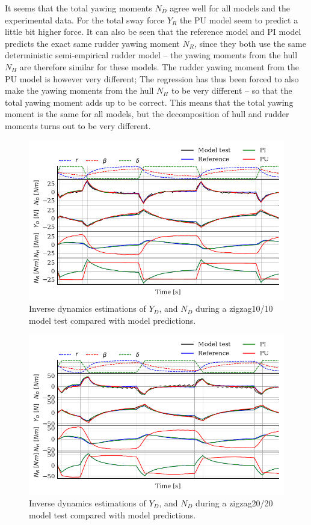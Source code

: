It seems that the total yawing moments $N_D$ agree well for all models and the experimental data. For the total sway force $Y_R$ the PU model seem to predict a little bit higher force.  
It can also be seen that the reference model and PI model predicts the exact same rudder yawing moment $N_R$, since they both use the same deterministic semi-empirical rudder model -- the yawing moments from the hull $N_H$ are therefore similar for these models. The rudder yawing moment from the PU model is however very different; The regression has thus been forced to also make the yawing moments from the hull $N_H$ to be very different -- so that the total yawing moment adds up to be correct. This means that the total yawing moment is the same for all models, but the decomposition of hull and rudder moments turns out to be very different.
\begin{figure}[h]
    \centering
    \includegraphics[width=\textwidth]{figures/results.ID_zigzag10.pdf}
    \caption{Inverse dynamics estimations of $Y_D$, and $N_D$ during a zigzag10/10 model test compared with model predictions.}
    \label{fig:ID_zigzag10}
\end{figure}
\begin{figure}[h]
    \centering
    \includegraphics[height=0.40\textheight]{figures/results.ID_zigzag20.pdf}
    \caption{Inverse dynamics estimations of $Y_D$, and $N_D$ during a zigzag20/20 model test compared with model predictions.}
    \label{fig:ID_zigzag20}
\end{figure}
